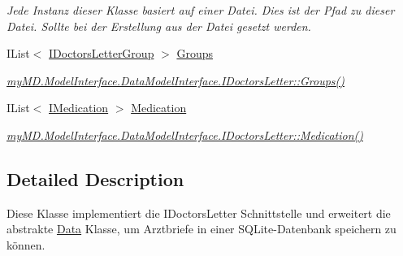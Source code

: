 \begin{CompactItemize}
\begin{CompactList}\small\item\em Jede Instanz dieser Klasse basiert auf einer Datei. Dies ist der Pfad zu dieser Datei. Sollte bei der Erstellung aus der Datei gesetzt werden. \item\end{CompactList}\item 
\hypertarget{classmy_m_d_1_1_model_1_1_data_model_1_1_doctors_letter_a37ede293936e29279ed543129451ec3}{
IList$<$ \hyperlink{interfacemy_m_d_1_1_model_interface_1_1_data_model_interface_1_1_i_doctors_letter_group}{IDoctors\-Letter\-Group} $>$ \hyperlink{classmy_m_d_1_1_model_1_1_data_model_1_1_doctors_letter_a37ede293936e29279ed543129451ec3}{Groups}}
\label{dc/d86/classmy_m_d_1_1_model_1_1_data_model_1_1_doctors_letter_a37ede293936e29279ed543129451ec3}

\begin{CompactList}\small\item\em \hyperlink{interfacemy_m_d_1_1_model_interface_1_1_data_model_interface_1_1_i_doctors_letter_a37ede293936e29279ed543129451ec3}{my\-MD.Model\-Interface.Data\-Model\-Interface.IDoctors\-Letter::Groups()} \item\end{CompactList}\item 
\hypertarget{classmy_m_d_1_1_model_1_1_data_model_1_1_doctors_letter_353bd6f65060d17097c3b03141e79cce}{
IList$<$ \hyperlink{interfacemy_m_d_1_1_model_interface_1_1_data_model_interface_1_1_i_medication}{IMedication} $>$ \hyperlink{classmy_m_d_1_1_model_1_1_data_model_1_1_doctors_letter_353bd6f65060d17097c3b03141e79cce}{Medication}}
\label{dc/d86/classmy_m_d_1_1_model_1_1_data_model_1_1_doctors_letter_353bd6f65060d17097c3b03141e79cce}

\begin{CompactList}\small\item\em \hyperlink{interfacemy_m_d_1_1_model_interface_1_1_data_model_interface_1_1_i_doctors_letter_353bd6f65060d17097c3b03141e79cce}{my\-MD.Model\-Interface.Data\-Model\-Interface.IDoctors\-Letter::Medication()} \item\end{CompactList}\end{CompactItemize}


\subsection{Detailed Description}
Diese Klasse implementiert die IDoctors\-Letter Schnittstelle und erweitert die abstrakte \hyperlink{classmy_m_d_1_1_model_1_1_data_model_1_1_data}{Data} Klasse, um Arztbriefe in einer SQLite-Datenbank speichern zu k\"{o}nnen. 

